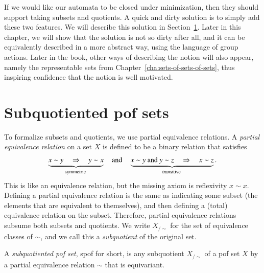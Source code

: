 If we would like our automata to be closed under minimization, then they should support taking subsets and quotients. A quick and dirty solution is to simply add these two features. We will describe this solution in Section~\ref{sec:subquotiented-pof-sets}. Later in this chapter, we will show that the solution is not so dirty after all, and it can be equivalently described in a more abstract way, using the language of group actions. Later in the book, other ways of describing the notion will also appear, namely the representable sets from Chapter~\ref{cha:sets-of-sets-of-sets}, thus inspiring confidence that the notion is well motivated.


\exercisepart


\section{Subquotiented pof sets}
\label{sec:subquotiented-pof-sets}
To formalize subsets and quotients, we use partial equivalence relations. 
    A \emph{partial equivalence relation} on a set $X$ is defined to be a binary relation that satisfies 
    \begin{align*}
        \myunderbrace{x \sim y \quad \Rightarrow \quad y \sim x}{symmetric} 
        \quad \text{and} \quad
        \myunderbrace{x \sim y  \text{ and }  y \sim z \quad \Rightarrow
        \quad x \sim z}{transitive}.
    \end{align*}
    This is like an equivalence relation, but the missing axiom is  reflexivity $x\sim x$. Defining a partial equivalence relation is the same as indicating some subset (the elements that are equivalent to themselves), and then defining a (total) equivalence relation on the subset. Therefore, partial equivalence relations subsume both subsets and quotients. 
     We write $X_{/\sim}$ for the set of equivalence classes of $\sim$, and we call this a \emph{subquotient} of the original set.

    \begin{definition}\label{def:subquotiented-pof-set}
        A \emph{subquotiented pof set}, spof for short, is any subquotient $X_{/\sim}$ of a pof set $X$ by a partial equivalence relation $\sim$ that is equivariant. 
    \end{definition}

